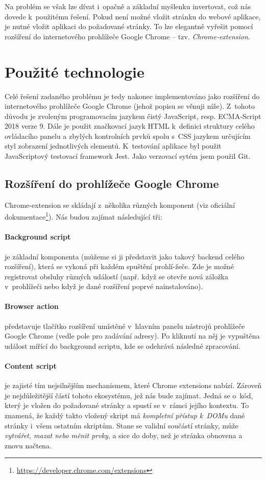 \documentclass[thesis=B,czech]{FITthesis}[2012/06/26]
\begin{document}
Na problém se však lze dívat i~opačně a základní myšlenku invertovat, což nás dovede k~použitému řešení. Pokud není možné vložit stránku do webové aplikace, je nutné vložit aplikaci do požadované stránky. To lze elegantně vyřešit pomocí rozšíření do internetového prohlížeče Google Chrome -- tzv. \emph{Chrome-extension}.


\section{Použité technologie}	
\label{sec:used_technology}
Celé řešení zadaného problému je tedy nakonec implementováno jako rozšíření do internetového prohlížeče Google Chrome (jehož popisu se věnuji níže). Z~tohoto důvodu je zvoleným programovacím jazykem čistý JavaScript, resp. ECMA-Script 2018 verze 9. Dále je použit značkovací jazyk HTML k~definici struktury celého ovládacího panelu a zbylých kontrolních prvků spolu s~CSS jazykem určujícím styl zobrazení jednotlivých elementů. K~testování aplikace byl použit JavaScriptový testovací framework Jest. Jako verzovací sytém jsem použil Git.

\subsection{Rozšíření do prohlížeče Google Chrome}
Chrome-extension se skládají z~několika různých komponent (viz oficiální dokumentace\footnote{\url{https://developer.chrome.com/extensions}}). Nás budou zajímat následující tři:
\paragraph{Background script} je základní komponenta (můžeme si ji představit jako takový backend celého rozšíření), která se vykoná při každém spuštění prohlí-žeče. Zde je možné registrovat obsluhy různých událostí (např. když se otevře nová záložka v~prohlížeči nebo když je dané rozšíření poprvé nainstalováno). 
\paragraph{Browser action} představuje tlačítko rozšíření umístěné v~hlavním panelu nástrojů prohlížeče Google Chrome (vedle pole pro zadávání adresy). Po kliknutí na něj je vypuštěna událost mířící do background scriptu, kde se odehrává následné zpracování.
\paragraph{Content script}\label{def:content_script} je zajisté tím nejsilnějším mechanismem, které Chrome extensions nabízí. Zároveň je nejdůležitější částí tohoto ekosystému, jež nás bude zajímat. Jedná se o~kód, který je vložen do požadované stránky a spustí se v~rámci jejího kontextu. To znamená, že každý takto vložený skript má \emph{kompletní přístup k~DOMu} dané stránky i~všem ostatním skriptům. Stane se validní součástí stránky, může \emph{vytvářet, mazat nebo měnit prvky}, a sice do doby, než je stránka obnovena a znovu načtena.
\end{document}

